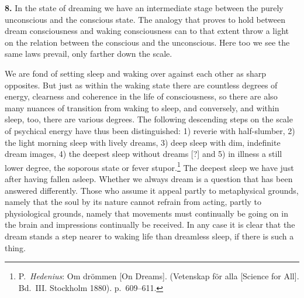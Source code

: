 \documentclass[12pt,a4paper]{book}
\newcommand{\opage}[1]{\marginnote{\footnotesize\textit{[#1]}}}
\begin{document}
\textbf{8.} In the state of dreaming we have an intermediate stage between
the purely unconscious and the conscious state. The analogy that proves
to hold between dream consciousness and waking consciousness can to that
extent throw a light on the relation between the conscious and the
unconscious. Here too we see the same laws prevail, only farther down the
scale.

We are fond of setting sleep and waking over against each other as sharp
opposites. But just as within the waking state there are countless
degrees of energy, clearness and coherence in the life of consciousness,
so there are also many nuances of transition from waking to sleep, and
conversely, and within sleep, too, there are various degrees. The
following descending steps on the scale of psychical energy have thus
been distinguished: 1) reverie with half-slumber, 2) the light morning
sleep with lively dreams, 3) deep sleep with dim, indefinite dream
images, 4) the deepest sleep without dreams [?] and 5) in illness a still
lower degree, the soporous state or
fever stupor.\footnote{P.~\emph{Hedenius}: Om drömmen [On Dreams].
(Vetenskap för alla [Science for All]. Bd.~III. Stockholm 1880).
p.~609--611.} The deepest sleep
\opage{94}we have just after having fallen asleep. Whether we always dream
is a question that has been answered differently. Those who assume it
appeal partly to metaphysical grounds, namely that the soul by its nature
cannot refrain from acting, partly to physiological grounds, namely that
movements must continually be going on in the brain and impressions
continually be received. In any case it is clear that the dream stands a
step nearer to waking life than dreamless sleep, if there is such a
thing.
\end{document}
